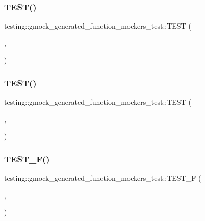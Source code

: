 \subsubsection{\texorpdfstring{TEST()}{TEST()}\hspace{0.1cm}{\footnotesize\ttfamily [13/14]}}
{\footnotesize\ttfamily testing\+::gmock\+\_\+generated\+\_\+function\+\_\+mockers\+\_\+test\+::\+T\+E\+ST (\begin{DoxyParamCaption}\item[{Mock\+Function\+Test}]{,  }\item[{As\+Std\+Function\+With\+Reference\+Parameter}]{ }\end{DoxyParamCaption})}

\mbox{\label{namespacetesting_1_1gmock__generated__function__mockers__test_af89476eb6775c51ca67e398d06c35d43}} 
\subsubsection{\texorpdfstring{TEST()}{TEST()}\hspace{0.1cm}{\footnotesize\ttfamily [14/14]}}
{\footnotesize\ttfamily testing\+::gmock\+\_\+generated\+\_\+function\+\_\+mockers\+\_\+test\+::\+T\+E\+ST (\begin{DoxyParamCaption}\item[{Mock\+Function\+Test}]{,  }\item[{Mock\+Method\+Size\+Overhead}]{ }\end{DoxyParamCaption})}

\mbox{\label{namespacetesting_1_1gmock__generated__function__mockers__test_aee64a5117451830331c321aecd10025f}} 
\subsubsection{\texorpdfstring{TEST\_F()}{TEST\_F()}\hspace{0.1cm}{\footnotesize\ttfamily [1/13]}}
{\footnotesize\ttfamily testing\+::gmock\+\_\+generated\+\_\+function\+\_\+mockers\+\_\+test\+::\+T\+E\+S\+T\+\_\+F (\begin{DoxyParamCaption}\item[{\mbox{\hyperlink{classtesting_1_1gmock__generated__function__mockers__test_1_1_function_mocker_test}{Function\+Mocker\+Test}}}]{,  }\item[{Mocks\+Void\+Function}]{ }\end{DoxyParamCaption})}

